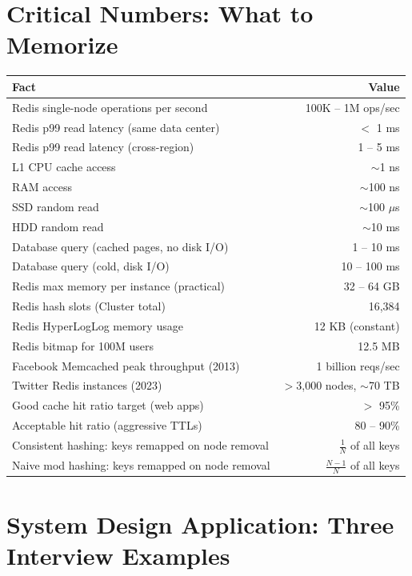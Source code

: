 \documentclass[11pt,a4paper]{article}
\begin{document}
\section{Critical Numbers: What to Memorize}

\begin{tabularx}{\linewidth}{Xr}
\toprule
\textbf{Fact} & \textbf{Value} \\
\midrule
Redis single-node operations per second & 100K -- 1M ops/sec \\
Redis p99 read latency (same data center) & $<$ 1 ms \\
Redis p99 read latency (cross-region) & 1 -- 5 ms \\
L1 CPU cache access & $\sim$1 ns \\
RAM access & $\sim$100 ns \\
SSD random read & $\sim$100 $\mu$s \\
HDD random read & $\sim$10 ms \\
Database query (cached pages, no disk I/O) & 1 -- 10 ms \\
Database query (cold, disk I/O) & 10 -- 100 ms \\
Redis max memory per instance (practical) & 32 -- 64 GB \\
Redis hash slots (Cluster total) & 16,384 \\
Redis HyperLogLog memory usage & 12 KB (constant) \\
Redis bitmap for 100M users & 12.5 MB \\
Facebook Memcached peak throughput (2013) & 1 billion reqs/sec \\
Twitter Redis instances (2023) & $>$3,000 nodes, $\sim$70 TB \\
Good cache hit ratio target (web apps) & $>$ 95\% \\
Acceptable hit ratio (aggressive TTLs) & 80 -- 90\% \\
Consistent hashing: keys remapped on node removal & $\frac{1}{N}$ of all keys \\
Naive mod hashing: keys remapped on node removal & $\frac{N-1}{N}$ of all keys \\
\bottomrule
\end{tabularx}

\section{System Design Application: Three Interview Examples}
\end{document}

